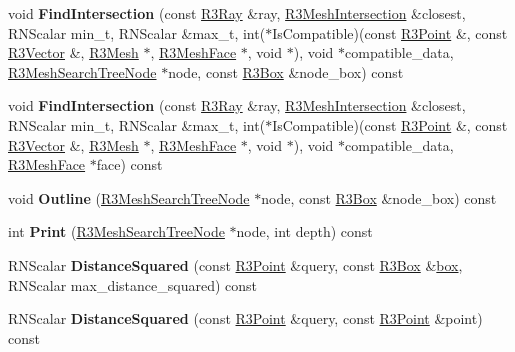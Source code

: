 \begin{DoxyCompactItemize}
\item 
void {\bfseries Find\+Intersection} (const \hyperlink{class_r3_ray}{R3\+Ray} \&ray, \hyperlink{struct_r3_mesh_intersection}{R3\+Mesh\+Intersection} \&closest, R\+N\+Scalar min\+\_\+t, R\+N\+Scalar \&max\+\_\+t, int($\ast$Is\+Compatible)(const \hyperlink{class_r3_point}{R3\+Point} \&, const \hyperlink{class_r3_vector}{R3\+Vector} \&, \hyperlink{class_r3_mesh}{R3\+Mesh} $\ast$, \hyperlink{class_r3_mesh_face}{R3\+Mesh\+Face} $\ast$, void $\ast$), void $\ast$compatible\+\_\+data, \hyperlink{class_r3_mesh_search_tree_node}{R3\+Mesh\+Search\+Tree\+Node} $\ast$node, const \hyperlink{class_r3_box}{R3\+Box} \&node\+\_\+box) const \hypertarget{class_r3_mesh_search_tree_a1a17209cd9a1b8fe1bf9b89946a02f0e}{}\label{class_r3_mesh_search_tree_a1a17209cd9a1b8fe1bf9b89946a02f0e}

\item 
void {\bfseries Find\+Intersection} (const \hyperlink{class_r3_ray}{R3\+Ray} \&ray, \hyperlink{struct_r3_mesh_intersection}{R3\+Mesh\+Intersection} \&closest, R\+N\+Scalar min\+\_\+t, R\+N\+Scalar \&max\+\_\+t, int($\ast$Is\+Compatible)(const \hyperlink{class_r3_point}{R3\+Point} \&, const \hyperlink{class_r3_vector}{R3\+Vector} \&, \hyperlink{class_r3_mesh}{R3\+Mesh} $\ast$, \hyperlink{class_r3_mesh_face}{R3\+Mesh\+Face} $\ast$, void $\ast$), void $\ast$compatible\+\_\+data, \hyperlink{class_r3_mesh_face}{R3\+Mesh\+Face} $\ast$face) const \hypertarget{class_r3_mesh_search_tree_a3fe22a837208a1c9f1c8079f98a185bf}{}\label{class_r3_mesh_search_tree_a3fe22a837208a1c9f1c8079f98a185bf}

\item 
void {\bfseries Outline} (\hyperlink{class_r3_mesh_search_tree_node}{R3\+Mesh\+Search\+Tree\+Node} $\ast$node, const \hyperlink{class_r3_box}{R3\+Box} \&node\+\_\+box) const \hypertarget{class_r3_mesh_search_tree_affc1315d4099ec49850e9d4453aa7464}{}\label{class_r3_mesh_search_tree_affc1315d4099ec49850e9d4453aa7464}

\item 
int {\bfseries Print} (\hyperlink{class_r3_mesh_search_tree_node}{R3\+Mesh\+Search\+Tree\+Node} $\ast$node, int depth) const \hypertarget{class_r3_mesh_search_tree_a2364b21f876564c29ce0a5d9d330c9aa}{}\label{class_r3_mesh_search_tree_a2364b21f876564c29ce0a5d9d330c9aa}

\item 
R\+N\+Scalar {\bfseries Distance\+Squared} (const \hyperlink{class_r3_point}{R3\+Point} \&query, const \hyperlink{class_r3_box}{R3\+Box} \&\hyperlink{structbox}{box}, R\+N\+Scalar max\+\_\+distance\+\_\+squared) const \hypertarget{class_r3_mesh_search_tree_a4659ab2afbc906afd7464b316790d572}{}\label{class_r3_mesh_search_tree_a4659ab2afbc906afd7464b316790d572}

\item 
R\+N\+Scalar {\bfseries Distance\+Squared} (const \hyperlink{class_r3_point}{R3\+Point} \&query, const \hyperlink{class_r3_point}{R3\+Point} \&point) const \hypertarget{class_r3_mesh_search_tree_a680ded7146c76c1154f0ad9dfe3d8118}{}\label{class_r3_mesh_search_tree_a680ded7146c76c1154f0ad9dfe3d8118}

\end{DoxyCompactItemize}
